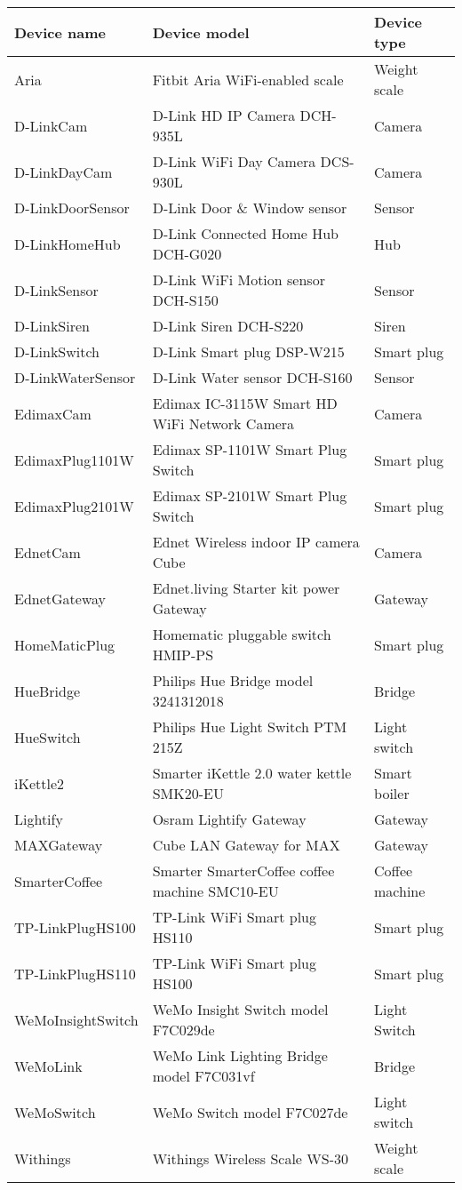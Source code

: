 \begin{table}[!h]
    \centering
    \begin{tabular}{l|l|l}
    \toprule
     Device name & Device model & Device type  \\
    \midrule
  Aria              & Fitbit Aria WiFi-enabled scale  &  Weight scale \\
  D-LinkCam         & D-Link HD IP Camera DCH-935L    &  Camera \\
  D-LinkDayCam      & D-Link WiFi Day Camera DCS-930L &  Camera \\
  D-LinkDoorSensor  & D-Link Door \& Window sensor     &  Sensor\\
  D-LinkHomeHub     &  D-Link Connected Home Hub DCH-G020 &  Hub  \\
  D-LinkSensor      & D-Link WiFi Motion sensor DCH-S150 &  Sensor \\
  D-LinkSiren       & D-Link Siren DCH-S220&  Siren \\
  D-LinkSwitch      & D-Link Smart plug DSP-W215  &  Smart plug \\
  D-LinkWaterSensor & D-Link Water sensor DCH-S160 &  Sensor \\
  EdimaxCam         & Edimax IC-3115W Smart HD WiFi Network Camera &  Camera \\
  EdimaxPlug1101W   & Edimax SP-1101W Smart Plug Switch  &  Smart plug \\
  EdimaxPlug2101W   & Edimax SP-2101W Smart Plug Switch&  Smart plug \\
  EdnetCam          & Ednet Wireless indoor IP camera Cube  &  Camera\\
  EdnetGateway      & Ednet.living Starter kit power Gateway & Gateway \\
  HomeMaticPlug     & Homematic pluggable switch HMIP-PS & Smart plug \\
  HueBridge         & Philips Hue Bridge model 3241312018 &  Bridge\\
  HueSwitch         & Philips Hue Light Switch PTM 215Z &  Light switch \\
  iKettle2          &  Smarter iKettle 2.0 water kettle SMK20-EU & Smart boiler \\
  Lightify          & Osram Lightify Gateway & Gateway \\
  MAXGateway        & Cube LAN Gateway for MAX & Gateway \\
  SmarterCoffee     & Smarter SmarterCoffee coffee machine SMC10-EU &  Coffee machine\\
  TP-LinkPlugHS100  & TP-Link WiFi Smart plug HS110 & Smart plug \\
  TP-LinkPlugHS110  & TP-Link WiFi Smart plug HS100 & Smart plug \\
  WeMoInsightSwitch & WeMo Insight Switch model F7C029de & Light Switch \\
  WeMoLink          & WeMo Link Lighting Bridge model F7C031vf & Bridge  \\
  WeMoSwitch        & WeMo Switch model F7C027de & Light switch \\
  Withings          &  Withings Wireless Scale WS-30 &  Weight scale\\
        

\end{tabular}
\end{table}
